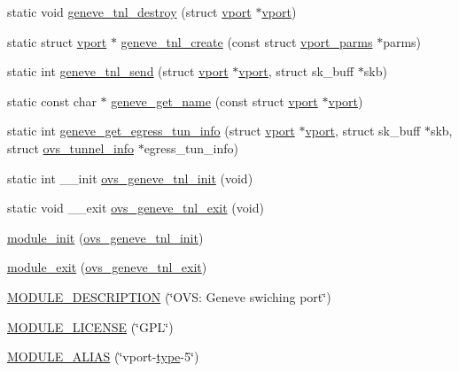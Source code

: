 \begin{DoxyCompactItemize}
\item 
static void \hyperlink{linux_2vport-geneve_8c_ab0a5d6fd5319e6c71acd2af4bde2c833}{geneve\+\_\+tnl\+\_\+destroy} (struct \hyperlink{structvport}{vport} $\ast$\hyperlink{structvport}{vport})
\item 
static struct \hyperlink{structvport}{vport} $\ast$ \hyperlink{linux_2vport-geneve_8c_a6b9a4a56d5a598c17c0bbfffce774798}{geneve\+\_\+tnl\+\_\+create} (const struct \hyperlink{structvport__parms}{vport\+\_\+parms} $\ast$parms)
\item 
static int \hyperlink{linux_2vport-geneve_8c_af7cfa0fa94438ef4fddf79129f8346d4}{geneve\+\_\+tnl\+\_\+send} (struct \hyperlink{structvport}{vport} $\ast$\hyperlink{structvport}{vport}, struct sk\+\_\+buff $\ast$skb)
\item 
static const char $\ast$ \hyperlink{linux_2vport-geneve_8c_a8f9770cc8d8fc8fad0f6f05a783513df}{geneve\+\_\+get\+\_\+name} (const struct \hyperlink{structvport}{vport} $\ast$\hyperlink{structvport}{vport})
\item 
static int \hyperlink{linux_2vport-geneve_8c_aed60d6de8f65dc856030e1ff6196b198}{geneve\+\_\+get\+\_\+egress\+\_\+tun\+\_\+info} (struct \hyperlink{structvport}{vport} $\ast$\hyperlink{structvport}{vport}, struct sk\+\_\+buff $\ast$skb, struct \hyperlink{structovs__tunnel__info}{ovs\+\_\+tunnel\+\_\+info} $\ast$egress\+\_\+tun\+\_\+info)
\item 
static int \+\_\+\+\_\+init \hyperlink{linux_2vport-geneve_8c_a250fcfc7da979abfb351d5290b7ae319}{ovs\+\_\+geneve\+\_\+tnl\+\_\+init} (void)
\item 
static void \+\_\+\+\_\+exit \hyperlink{linux_2vport-geneve_8c_a8fcdbd3154bb84fb2ab88296a0bd03c7}{ovs\+\_\+geneve\+\_\+tnl\+\_\+exit} (void)
\item 
\hyperlink{linux_2vport-geneve_8c_a67da53b39bd67cb2fe98ebf15b882489}{module\+\_\+init} (\hyperlink{vport-geneve_8c_a250fcfc7da979abfb351d5290b7ae319}{ovs\+\_\+geneve\+\_\+tnl\+\_\+init})
\item 
\hyperlink{linux_2vport-geneve_8c_a77ee305130afe983aa92a926c6e91f88}{module\+\_\+exit} (\hyperlink{vport-geneve_8c_a8fcdbd3154bb84fb2ab88296a0bd03c7}{ovs\+\_\+geneve\+\_\+tnl\+\_\+exit})
\item 
\hyperlink{linux_2vport-geneve_8c_afa1a2e7e8154bcd5ff96b22a9153cd52}{M\+O\+D\+U\+L\+E\+\_\+\+D\+E\+S\+C\+R\+I\+P\+T\+I\+O\+N} (\char`\"{}O\+V\+S\+: Geneve swiching port\char`\"{})
\item 
\hyperlink{linux_2vport-geneve_8c_ad94b36675e7eb067ea3ce6ff9e244a44}{M\+O\+D\+U\+L\+E\+\_\+\+L\+I\+C\+E\+N\+S\+E} (\char`\"{}G\+P\+L\char`\"{})
\item 
\hyperlink{linux_2vport-geneve_8c_a6f89164187509105f25d6071184282d7}{M\+O\+D\+U\+L\+E\+\_\+\+A\+L\+I\+A\+S} (\char`\"{}vport-\/\hyperlink{flow_8h_ab22aaab04f806700def00f32823fcb9e}{type}-\/5\char`\"{})
\end{DoxyCompactItemize}


